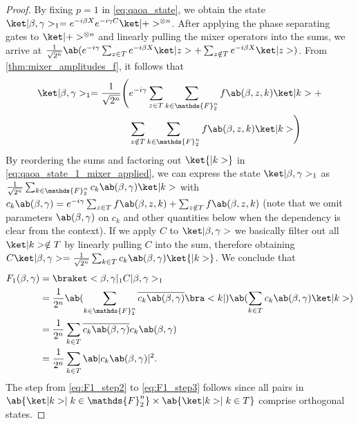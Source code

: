 \begin{proof}
  By fixing $p = 1$ in \cref{eq:qaoa_state}, we obtain the state $\ket|\mangle, \pangle>_1 = e^{-i \mangle X} e^{-i \pangle C} \ket|+>^{\otimes n}$. After applying the phase separating gates to $\ket|+>^{\otimes n}$ and linearly pulling the mixer operators into the sums, we arrive at $\frac{1}{\sqrt{2^n}} \ab(e^{-i \pangle} \sum_{z \in T} e^{-i \mangle X} \ket|z> + \sum_{z \notin T} e^{-i \mangle X} \ket|z>)$. From \cref{thm:mixer_amplitudes_f}, it follows that
  \begin{equation}
  \begin{aligned}
    \label{eq:qaoa_state_1_mixer_applied}
    \ket|\mangle, \pangle>_1 = \frac{1}{\sqrt{2^n}} \Biggl(&e^{-i \pangle} \sum_{z \in T} \sum_{k \in \mathds{F}_2^n} f\ab(\mangle, z, k) \ket|k> + \\
                                                         &\sum_{z \notin T} \sum_{k \in \mathds{F}_2^n} f\ab(\mangle, z, k) \ket|k>\Biggr)  
  \end{aligned}
  \end{equation}
    By reordering the sums and factoring out $\ket{|k>}$ in \cref{eq:qaoa_state_1_mixer_applied}, we can express the state $\ket|\mangle, \pangle>_1$ as $\frac{1}{\sqrt{2^n}} \sum_{k \in \mathds{F}_2^n} c_k\ab(\mangle,\pangle) \ket|k>$ with $c_k\ab(\mangle,\pangle) = e^{-i \pangle} \sum_{z \in T} f\ab(\mangle, z, k) + \sum_{z \notin T} f\ab(\mangle, z, k)$
    (note that we omit parameters \(\ab(\mangle, \pangle)\) on \(c_{k}\) and other quantities below when the dependency is clear from the context). If we apply $C$ to $\ket|\mangle, \pangle>$ we basically filter out all $\ket|k> \notin T$ by linearly pulling $C$ into the sum, therefore obtaining $C \ket|\mangle, \pangle> = \frac{1}{\sqrt{2^n}} \sum_{k \in T} c_k\ab(\mangle,\pangle) \ket{|k>}$. We conclude that
  \begin{align}
    F_1(\mangle, \pangle) &=
    \braket<\mangle, \pangle|_1 C |\mangle, \pangle>_1\nonumber\\
    &= \frac{1}{2^n} \ab(\sum_{k \in \mathds{F}_2^n} \cconj{c_k\ab(\mangle,\pangle)} \bra<k|) \ab(\sum_{k \in T} c_k\ab(\mangle,\pangle) \ket|k>)\label{eq:F1_step2}\\ 
      &= \frac{1}{2^n} \sum_{k \in T} \cconj{c_k\ab(\mangle,\pangle)} c_k\ab(\mangle,\pangle) \\
      &= \frac{1}{2^n} \sum_{k \in T} \ab|c_k\ab(\mangle,\pangle)|^2.\label{eq:F1_step3}
  \end{align}
    The step from \cref{eq:F1_step2} to \cref{eq:F1_step3} follows since all pairs in $\ab\{\ket|k> \mid k \in \mathds{F}_2^n\} \times \ab\{\ket|k> \mid k \in T\}$ comprise orthogonal states. 

\end{proof}
